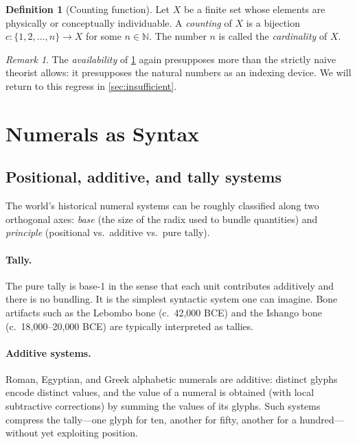 \documentclass[12pt]{article}
\theoremstyle{definition}
\newtheorem{definition}[theorem]{Definition}
\theoremstyle{remark}
\newtheorem{remark}[theorem]{Remark}
\begin{document}
\begin{definition}[Counting function]
\label{def:counting}
Let $X$ be a finite set whose elements are physically or conceptually
individuable. A \emph{counting} of $X$ is a bijection $c : \{1, 2, \ldots,
n\} \to X$ for some $n \in \mathbb{N}$. The number $n$ is called the
\emph{cardinality} of $X$.
\end{definition}

\begin{remark}
The \emph{availability} of \cref{def:counting} again presupposes more
than the strictly naive theorist allows: it presupposes the natural numbers
as an indexing device. We will return to this regress in
\cref{sec:insufficient}.
\end{remark}

\section{Numerals as Syntax}
\label{sec:numerals-syntax}

\subsection{Positional, additive, and tally systems}

The world's historical numeral systems can be roughly classified along two
orthogonal axes: \emph{base} (the size of the radix used to bundle
quantities) and \emph{principle} (positional vs.\ additive vs.\ pure tally).

\paragraph{Tally.} The pure tally is base-1 in the sense that each unit
contributes additively and there is no bundling. It is the simplest
syntactic system one can imagine. Bone artifacts such as the Lebombo bone
(c.\ 42{,}000 BCE) and the Ishango bone (c.\ 18{,}000--20{,}000 BCE) are
typically interpreted as tallies.

\paragraph{Additive systems.} Roman, Egyptian, and Greek alphabetic
numerals are additive: distinct glyphs encode distinct values, and the
value of a numeral is obtained (with local subtractive corrections) by
summing the values of its glyphs. Such systems compress the tally---one
glyph for ten, another for fifty, another for a hundred---without yet
exploiting position.
\end{document}
